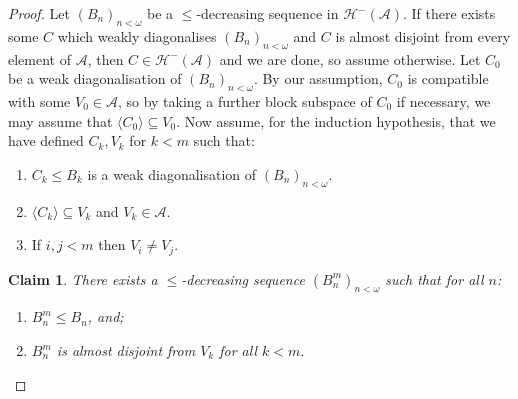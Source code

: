 \documentclass[11pt,reqno]{amsart}
\theoremstyle{plain}
\numberwithin{equation}{section}
\newtheorem{claim}{Claim}
\theoremstyle{definition}
\renewcommand{\c}[1]{\langle #1 \rangle}
\newcommand{\cal}{\mathcal}
\newcommand{\A}{\cal{A}}
\renewcommand{\H}{\cal{H}}
\begin{document}
\begin{proof}
    Let $(B_n)_{n<\omega}$ be a $\leq$-decreasing sequence in $\H^-(\A)$. If there exists some $C$ which weakly diagonalises $(B_n)_{n<\omega}$ and $C$ is almost disjoint from every element of $\A$, then $C \in \H^-(\A)$ and we are done, so assume otherwise. Let $C_0$ be a weak diagonalisation of $(B_n)_{n<\omega}$. By our assumption, $C_0$ is compatible with some $V_0 \in \A$, so by taking a further block subspace of $C_0$ if necessary, we may assume that $\c{C_0} \subseteq V_0$. Now assume, for the induction hypothesis, that we have defined $C_k,V_k$ for $k < m$ such that:
    \begin{enumerate}
        \item $C_k \leq B_k$ is a weak diagonalisation of $(B_n)_{n<\omega}$.

        \item $\c{C_k} \subseteq V_k$ and $V_k \in \A$.

        \item If $i,j < m$ then $V_i \neq V_j$.
    \end{enumerate}

    \begin{claim}
        There exists a $\leq$-decreasing sequence $(B_n^m)_{n<\omega}$ such that for all $n$:
        \begin{enumerate}
            \item $B_n^m \leq B_n$, and;

            \item $B_n^m$ is almost disjoint from $V_k$ for all $k < m$.
        \end{enumerate}
    \end{claim}


\end{proof}
\end{document}
